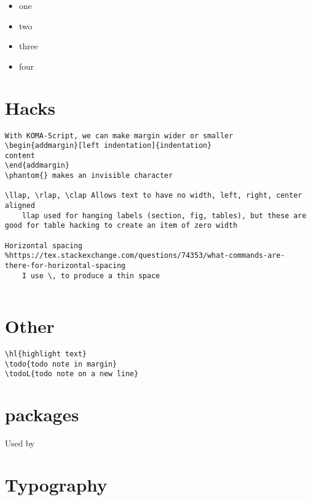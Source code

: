 \documentclass{corpboreport}
\newcommand{\llcmd}[1]{\leavevmode\llap{\texttt{\detokenize{#1}\ }}}
\newcommand{\llcmdlink}[2]{\href{#2}{\hspace{-15ex}}\hspace{15ex}\llcmd{#1}}%
\begin{document}
\begin{itemize}[autopunc]
	\item one
	\item two
	\item three
	\item four
\end{itemize}

\section{Hacks}

\lstset{language=tex}
\begin{lstlisting}
With KOMA-Script, we can make margin wider or smaller
\begin{addmargin}[left indentation]{indentation}
content
\end{addmargin}
\phantom{} makes an invisible character

\llap, \rlap, \clap	Allows text to have no width, left, right, center aligned
	llap used for hanging labels (section, fig, tables), but these are good for table hacking to create an item of zero width

Horizontal spacing	%https://tex.stackexchange.com/questions/74353/what-commands-are-there-for-horizontal-spacing
	I use \, to produce a thin space


\end{lstlisting}

\section{Other}

\begin{lstlisting}
\hl{highlight text}
\todo{todo note in margin}
\todoL{todo note on a new line}
\end{lstlisting}


\IntentionallyBlankPage

\section{packages}

\llcmdlink{makecell}{http://mirrors.ctan.org/macros/latex/contrib/makecell/makecell.pdf}Used by

\section{Typography}
\end{document}
